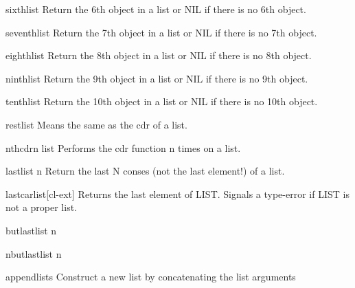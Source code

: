 \documentclass[10pt,english]{book}
\begin{document}
\begin{accessor}{sixth}{list}
  Return the 6th object in a list or NIL if there is no 6th object.
\end{accessor}

\begin{accessor}{seventh}{list}
  Return the 7th object in a list or NIL if there is no 7th object.
\end{accessor}

\begin{accessor}{eighth}{list}
  Return the 8th object in a list or NIL if there is no 8th object.
\end{accessor}

\begin{accessor}{ninth}{list}
  Return the 9th object in a list or NIL if there is no 9th object.
\end{accessor}

\begin{accessor}{tenth}{list}
  Return the 10th object in a list or NIL if there is no 10th object.
\end{accessor}

\begin{accessor}{rest}{list}
  Means the same as the cdr of a list.
\end{accessor}

\begin{function}{nthcdr}{n list}
  Performs the cdr function n times on a list.
\end{function}

\begin{function}{last}{list \op n}
  Return the last N conses (not the last element!) of a list.
\end{function}

\begin{function}{lastcar}{list}[cl-ext]
  Returns the last element of LIST. Signals a type-error if LIST is not a
proper list.
\end{function}

\begin{function}{butlast}{list \op n}
  
\end{function}

\begin{function}{nbutlast}{list \op n}
  
\end{function}

\begin{function}{append}{\rest lists}
  Construct a new list by concatenating the list arguments
\end{function}
\end{document}
